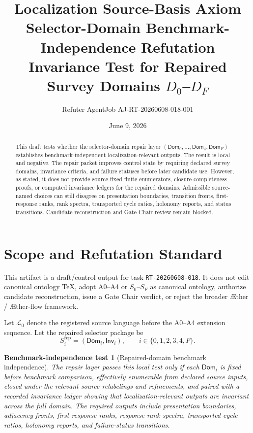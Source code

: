 \documentclass[11pt]{article}
\title{\textbf{Localization Source-Basis Axiom Selector-Domain Benchmark-Independence Refutation}\\[0.35em]
\large Invariance Test for Repaired Survey Domains \(D_0\)--\(D_F\)}
\author{Refuter AgentJob AJ-RT-20260608-018-001}
\date{June 9, 2026}
\newcommand{\Aether}{\AE{}ther}
\newcommand{\Aflow}{\AE{}ther-flow}
\newcommand{\TheoryProgram}{\Aether{} / \Aflow{} framework}
\newcommand{\Lang}{\mathcal{L}_{0}}
\newcommand{\Dom}{\mathsf{Dom}}
\newcommand{\Inv}{\mathsf{Inv}}
\newtheorem{test}{Benchmark-independence test}
\begin{document}
\maketitle

\begin{abstract}
This draft tests whether the selector-domain repair layer
\((\Dom_0,\ldots,\Dom_4,\Dom_F)\) establishes benchmark-independent
localization-relevant outputs. The result is local and negative. The repair
packet improves control state by requiring declared survey domains,
invariance criteria, and failure statuses before later candidate use.
However, as stated, it does not provide source-fixed finite enumerators,
closure-completeness proofs, or computed invariance ledgers for the repaired
domains. Admissible source-named choices can still disagree on presentation
boundaries, transition fronts, first-response ranks, rank spectra,
transported cycle ratios, holonomy reports, and status transitions.
Candidate reconstruction and Gate Chair review remain blocked.
\end{abstract}

\section{Scope and Refutation Standard}

This artifact is a draft/control output for task \texttt{RT-20260608-018}.
It does not edit canonical ontology TeX, adopt A0--A4 or \(S_0\)--\(S_F\) as
canonical ontology, authorize candidate reconstruction, issue a Gate Chair
verdict, or reject the broader \TheoryProgram{}.

Let \(\Lang\) denote the registered source language before the A0--A4
extension sequence. Let the repaired selector package be
\[
S_i^{\mathrm{rep}}=(\Dom_i,\Inv_i), \qquad i\in\{0,1,2,3,4,F\}.
\]

\begin{test}[Repaired-domain benchmark independence]
The repair layer passes this local test only if each \(\Dom_i\) is fixed
before benchmark comparison, effectively enumerable from declared source
inputs, closed under the relevant source relabelings and refinements, and
paired with a recorded invariance ledger showing that localization-relevant
outputs are invariant across the full domain. The required outputs include
presentation boundaries, adjacency fronts, first-response ranks, response
rank spectra, transported cycle ratios, holonomy reports, and failure-status
transitions.
\end{test}
\end{document}
